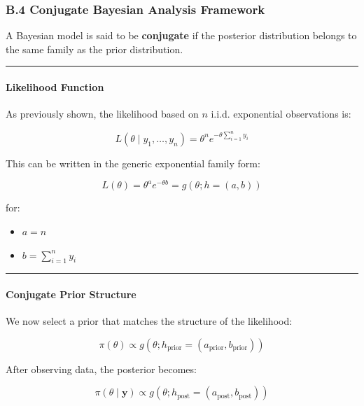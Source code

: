 \documentclass[
]{article}
\providecommand{\tightlist}{%
  \setlength{\itemsep}{0pt}\setlength{\parskip}{0pt}}
\begin{document}
\subsubsection{B.4 Conjugate Bayesian Analysis
Framework}\label{b.4-conjugate-bayesian-analysis-framework}

A Bayesian model is said to be \textbf{conjugate} if the posterior
distribution belongs to the same family as the prior distribution.

\begin{center}\rule{0.5\linewidth}{0.5pt}\end{center}

\paragraph{Likelihood Function}\label{likelihood-function}

As previously shown, the likelihood based on \(n\) i.i.d. exponential
observations is:

\[
L(\theta \mid y_1, \dots, y_n) = \theta^n e^{-\theta \sum_{i=1}^n y_i}
\]

This can be written in the generic exponential family form:

\[
L(\theta) = \theta^a e^{-\theta b} = g(\theta; h = (a, b))
\]

for:

\begin{itemize}
\tightlist
\item
  \(a = n\)\\
\item
  \(b = \sum_{i=1}^n y_i\)
\end{itemize}

\begin{center}\rule{0.5\linewidth}{0.5pt}\end{center}

\paragraph{Conjugate Prior Structure}\label{conjugate-prior-structure}

We now select a prior that matches the structure of the likelihood:

\[
\pi(\theta) \propto g(\theta; h_{\text{prior}} = (a_{\text{prior}}, b_{\text{prior}}))
\]

After observing data, the posterior becomes:

\[
\pi(\theta \mid \mathbf{y}) \propto g(\theta; h_{\text{post}} = (a_{\text{post}}, b_{\text{post}}))
\]
\end{document}
